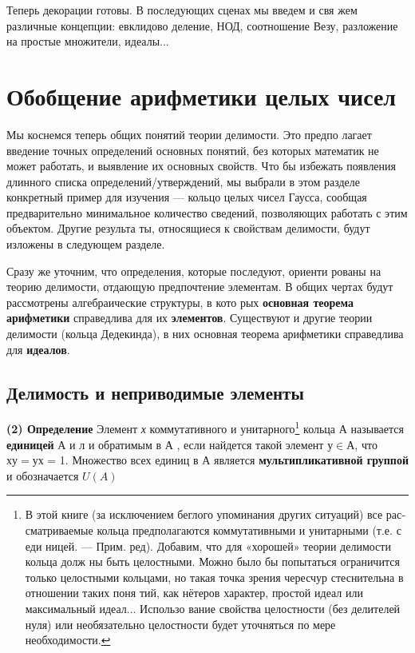 \documentclass{mai_book}
\begin{document}
Теперь  декорации готовы. В  последующих сценах мы  введем и свя­
жем различные концепции: евклидово деление, НОД, соотношение Везу, 
разложение на простые  множители,  идеалы...
\section{Обобщение арифметики целых чисел}
\noindent Мы  коснемся  теперь  общих  понятий  теории  делимости.  Это  предпо­
лагает  введение  точных  определений  основных  понятий,  без  которых 
математик не может работать, и выявление их основных свойств.  Что­
бы избежать появления длинного списка определений/утверждений, мы
\pagebreak
выбрали  в  этом  разделе  конкретный  пример  для  изучения  — кольцо 
целых чисел Гаусса, сообщая предварительно минимальное количество 
сведений,  позволяющих  работать с  этим  объектом.  Другие  результа­
ты, относящиеся к свойствам делимости, будут изложены в следующем 
разделе.

Сразу же  уточним, что определения,  которые последуют,  ориенти­
рованы  на теорию  делимости,  отдающую предпочтение  элементам.  В 
общих чертах будут рассмотрены  алгебраические  структуры,  в  кото­
рых 
\textbf{основная  теорема  арифметики} 
справедлива для  их 
\textbf{элемен­тов}. 
Существуют  и  другие  теории  делимости  (кольца Дедекинда),  в 
них основная теорема арифметики справедлива для 
\textbf{идеалов}.
\subsection{Делимость и неприводимые элементы}

\noindent \textbf{(2) Определение}
Элемент  \textit{х}   коммутативного  и   унитарного\footnote{В  этой  книге  (за исключением беглого упоминания других ситуаций) все рас­
сматриваемые кольца предполагаются коммутативными и унитарными (т.е. 
с
 еди­
ницей. — 
Прим. ред).
 Добавим, что для «хорошей» теории делимости кольца долж­
ны быть целостными. Можно было бы попытаться ограничится только целостными
кольцами, но такая точка зрения чересчур стеснительна в отношении таких поня­
тий,  как  нётеров характер, простой идеал или  максимальный идеал...  Использо­
вание  свойства целостности  (без  делителей  нуля)  или  необязательно целостности
будет уточняться по мере необходимости.}
  кольца  А   называется
\textbf{единицей} 
А   и л и  обратимым в   А ,  если  найдется  такой элемент  $у \in А$,
что $ху  =  ух$ =  1. 
Множество  всех единиц в   А   является
 \textbf{мультиплика­тивной группой} 
и  обозначается $U(A)$
\newline
\end{document}
